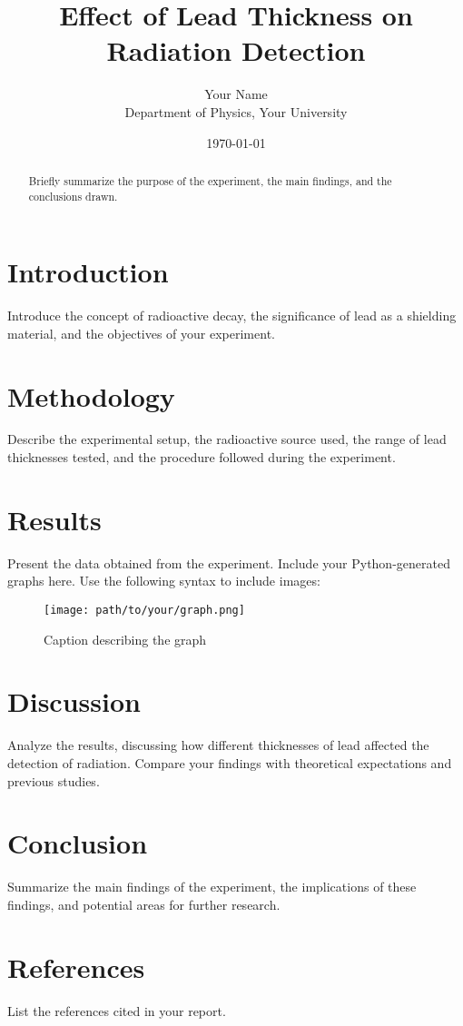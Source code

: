 \documentclass[12pt]{article}
\title{Effect of Lead Thickness on Radiation Detection}
\author{Your Name\\
        Department of Physics, Your University}
\date{\today}
\begin{document}
\maketitle

\begin{abstract}
    Briefly summarize the purpose of the experiment, the main findings, and the conclusions drawn.
\end{abstract}

\section{Introduction}
    Introduce the concept of radioactive decay, the significance of lead as a shielding material, and the objectives of your experiment.

\section{Methodology}
    Describe the experimental setup, the radioactive source used, the range of lead thicknesses tested, and the procedure followed during the experiment.

\section{Results}
    Present the data obtained from the experiment. Include your Python-generated graphs here. Use the following syntax to include images:
    
    \begin{figure}[h!]
        \centering
        \texttt{[image: path/to/your/graph.png]}
        \caption{Caption describing the graph}
        \label{fig:graph1}
    \end{figure}

\section{Discussion}
    Analyze the results, discussing how different thicknesses of lead affected the detection of radiation. Compare your findings with theoretical expectations and previous studies.

\section{Conclusion}
    Summarize the main findings of the experiment, the implications of these findings, and potential areas for further research.

\section{References}
    List the references cited in your report.
\end{document}
